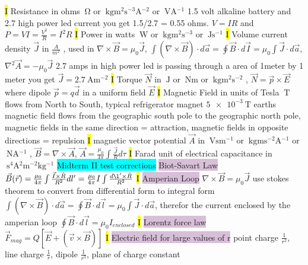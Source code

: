 \documentclass[fontsize=4pt]{scrartcl}
\begin{document}
\hl{I}
\colorbox{RubineRed}{Resistance} in ohms $\SI{}{ \ohm}$ or $\SI{}{ \kilogram \meter^2 \second^{-3} \ampere^{-2}}$ or $\SI{}{ \volt \ampere^{-1}}$ 1.5 volt alkaline battery and 2.7 high power led current you get 1.5/2.7 = 0.55 ohms. $V=IR$ and $P=VI=\frac{V^2}{R}=I^{2}R$
\hl{I}
\colorbox{RubineRed}{Power} in watts $\SI{}{ \watt}$ or $\SI{}{\kilogram \meter^2 \second^{-3}}$ or $\SI{}{ \joule \second^{-1}}$
\hl{I} 
\colorbox{RubineRed}{Volume current density} $\vec{J}$ in $\frac{A}{m^2}$ , used in $\nabla \times \vec{B} = \mu_0 \vec{J}$, $\int (\nabla \times \vec{B}) \cdot d\vec{a} = \oint \vec{B} \cdot d\vec{I} = \mu_0 \int \vec{J} \cdot d\vec{a}$, $\nabla^2 \vec{A} = -\mu_{0} \vec{J}$ 2.7 amps in high power led is passing through a area of 1meter by 1 meter you get $\vec{J} = \SI{2.7}{ \ampere \meter^{-2}}$
\hl{I}
\colorbox{RubineRed}{Torque} $\vec{N}$ in $\SI{}{ \joule}$ or $\SI{}{ \newton \meter}$ or $\SI{}{ \kilogram \meter^2 \second^{-2}}$ , $ \vec{N} = \vec{p} \times \vec{E}$ where dipole $\vec{p} = q\vec{d}$ in a uniform field $\vec{E}$
\hl{I}
\colorbox{RubineRed}{Magnetic Field} in units of Tesla $\SI{}{ \tesla}$ flows from North to South, typical refrigerator magnet $\SI{5e-3}{ \tesla}$ earths magnetic field flows from the geographic south pole to the geographic north pole, magnetic fields in the same direction = attraction, magnetic fields in opposite directions = repulsion
\hl{I}
\colorbox{RubineRed}{magnetic vector potential} $\vec{A}$ in $\SI{}{ \volt \second \meter^{-1}}$ or $\SI{}{ \kilogram \meter \second^{-2} \ampere^{-1}}$ or  $\SI{}{ \newton \ampere^{-1}}$ , $\vec{B} = \nabla \times \vec{A}$, $\vec{A} = \frac{\mu_0}{4\pi} \int \frac{\vec{J}}{R} d\tau$
\hl{I}
\colorbox{RubineRed}{Farad} unit of electrical capacitance in  $\SI{}{ \second^4 \ampere^2 \meter^{-2} \kilogram^{-1}}$
\colorbox{Cyan}{Midterm II test corrections}
\colorbox{Thistle}{Biot-Savart Law} $\vec{B}(\vec{r}) = \frac{\mu_0}{4\pi} \int \frac{\vec{I} \times \hat{R}}{R^2} dl^{\prime} = \frac{\mu_0}{4\pi}I \int \frac{d\l^{\prime} \times \hat{R}}{R^2}$
\hl{I}
\colorbox{Thistle}{Amperian Loop} $\nabla \times \vec{B} = \mu_0 \vec{J}$ use stokes theorem to convert from differential form to integral form $\int (\nabla \times \vec{B}) \cdot d\vec{a} = \oint \vec{B} \cdot d\vec{l} = \mu_0 \int \vec{J} \cdot d\vec{a}$, therefor the current enclosed by the amperian loop $\oint \vec{B} \cdot d\vec{l} = \mu_0 I_{enclosed}$
\hl{I}
\colorbox{Thistle}{Lorentz force law} $\vec{F}_{mag} = Q[\vec{E} + (\vec{v} \times \vec{B})]$
\hl{I}
\colorbox{Thistle}{Electric field for large values of r} point charge $\frac{1}{r^2}$, line charge $\frac{1}{r}$, dipole $\frac{1}{r^3}$, plane of charge constant 
\end{document}
